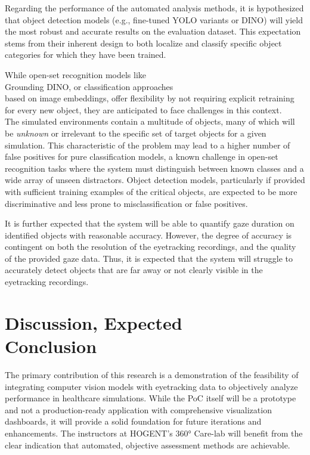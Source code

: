 \documentclass[english]{hogent-article}
\begin{document}
Regarding the performance of the automated analysis methods, it is hypothesized that object detection models (e.g., fine-tuned YOLO variants or DINO) will yield the most robust and accurate results on the evaluation dataset.
This expectation stems from their inherent design to both localize and classify specific object categories for which they have been trained.

While open-set recognition models like\\ Grounding DINO, or classification approaches\\ based on image embeddings, offer flexibility by not requiring explicit retraining for every new object, they are anticipated to face challenges in this context.\\
The simulated environments contain a multitude of objects, many of which will be \textit{unknown} or irrelevant to the specific set of target objects for a given simulation.
This characteristic of the problem may lead to a higher number of false positives for pure classification models, a known challenge in open-set recognition tasks where the system must distinguish between known classes and a wide array of unseen distractors.
Object detection models, particularly if provided with sufficient training examples of the critical objects, are expected to be more discriminative and less prone to misclassification or false positives.

It is further expected that the system will be able to quantify gaze duration on identified objects with reasonable accuracy.
However, the degree of accuracy is contingent on both the resolution of the eyetracking recordings, and the quality of the provided gaze data.
Thus, it is expected that the system will struggle to accurately detect objects that are far away or not clearly visible in the eyetracking recordings. 

\section{Discussion, Expected\\ Conclusion}
\label{sec:discussion-conclusion}

The primary contribution of this research is a demonstration of the feasibility of 
integrating computer vision models with eyetracking data to objectively analyze performance in healthcare simulations.
While the PoC itself will be a prototype and not a production-ready application with comprehensive visualization dashboards, 
it will provide a solid foundation for future iterations and enhancements.
The instructors at HOGENT's 360° Care-lab will benefit from the clear indication that automated, 
objective assessment methods are achievable.
\end{document}
